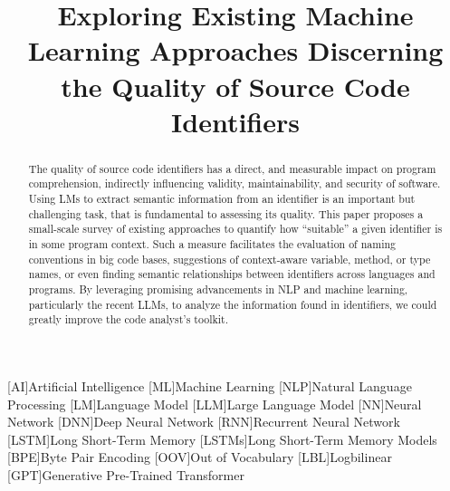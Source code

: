 \documentclass[conference]{IEEEtran}
\begin{document}

[AI]{Artificial Intelligence}
[ML]{Machine Learning}
[NLP]{Natural Language Processing}
[LM]{Language Model}
[LLM]{Large Language Model}
[NN]{Neural Network}
[DNN]{Deep Neural Network}
[RNN]{Recurrent Neural Network}
[LSTM]{Long Short-Term Memory}
[LSTMs]{Long Short-Term Memory Models}
[BPE]{Byte Pair Encoding}
[OOV]{Out of Vocabulary}
[LBL]{Logbilinear}
[GPT]{Generative Pre-Trained Transformer}

\title{Exploring Existing Machine Learning Approaches Discerning the Quality of Source
Code Identifiers}

\author{
\and
{}
}

\maketitle

\begin{abstract}

    The quality of source code identifiers has a direct, and measurable impact on program
    comprehension, indirectly influencing validity, maintainability, and security of
    software. Using \acp{LM} to extract semantic information from an identifier is an
    important but challenging task, that is fundamental to assessing its quality. This
    paper proposes a small-scale survey of existing approaches to quantify how
    ``suitable'' a given identifier is in some program context. Such a measure facilitates
    the evaluation of naming conventions in big code bases, suggestions of context-aware
    variable, method, or type names, or even finding semantic relationships between
    identifiers across languages and programs. By leveraging promising advancements in
    \ac{NLP} and machine learning, particularly the recent \acp{LLM}, to analyze the
    information found in identifiers, we could greatly improve the code analyst's toolkit.

\end{abstract}
\acresetall
\end{document}
